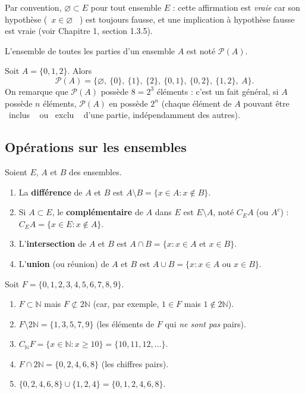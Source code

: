\documentclass[a4paper,12pt,openany]{book}
\providecommand{\og}{\guillemotleft~}
\providecommand{\fg}{\ifhmode~\fi\guillemotright}
\begin{document}
\begin{remarque}
Par convention, $\varnothing \subset E$ pour tout ensemble $E$ : cette
affirmation est \emph{vraie} car son hypothèse (\og $x \in \varnothing$ \fg)
est toujours fausse, et une implication à hypothèse fausse est vraie (voir
Chapitre 1, section 1.3.5).
\end{remarque}


\begin{definition}
L'ensemble de toutes les parties d'un ensemble $A$ est noté $\mathcal{P}(A)$.
\end{definition}

\begin{exemple}
Soit $A=\{0,1,2\}$. Alors
\[
\mathcal{P}(A) = \big\{\varnothing,\ \{0\},\ \{1\},\ \{2\},\ \{0,1\},\ \{0,2\},\ \{1,2\},\ A\big\}.
\]
On remarque que $\mathcal{P}(A)$ possède $8=2^3$ éléments : c'est un fait
général, si $A$ possède $n$ éléments, $\mathcal{P}(A)$ en possède $2^n$
(chaque élément de $A$ pouvant être \og inclus \fg{} ou \og exclu \fg{} d'une
partie, indépendamment des autres).
\end{exemple}

\subsection{Opérations sur les ensembles}


\begin{definition}
Soient $E$, $A$ et $B$ des ensembles.
\begin{enumerate}
  \item La \textbf{différence} de $A$ et $B$ est
  $A\setminus B = \{x \in A : x \notin B\}$.
  \item Si $A \subset E$, le \textbf{complémentaire} de $A$ dans $E$ est
  $E\setminus A$, noté $C_E A$ (ou $A^c$) : $C_E A = \{x \in E : x \notin A\}$.
  \item L'\textbf{intersection} de $A$ et $B$ est
  $A \cap B = \{x : x \in A \text{ et } x \in B\}$.
  \item L'\textbf{union} (ou réunion) de $A$ et $B$ est
  $A \cup B = \{x : x \in A \text{ ou } x \in B\}$.
\end{enumerate}
\end{definition}

\begin{exemple}
Soit $F=\{0,1,2,3,4,5,6,7,8,9\}$.
\begin{enumerate}
  \item $F \subset \mathbb{N}$ mais $F \not\subset 2\mathbb{N}$ (car, par
  exemple, $1 \in F$ mais $1 \notin 2\mathbb{N}$).
  \item $F \setminus 2\mathbb{N} = \{1,3,5,7,9\}$ (les éléments de $F$ qui
  \emph{ne sont pas} pairs).
  \item $C_{\mathbb{N}} F = \{x \in \mathbb{N} : x \geq 10\} =
  \{10,11,12,\dots\}$.
  \item $F \cap 2\mathbb{N} = \{0,2,4,6,8\}$ (les chiffres pairs).
  \item $\{0,2,4,6,8\} \cup \{1,2,4\} = \{0,1,2,4,6,8\}$.
\end{enumerate}
\end{exemple}
\end{document}
